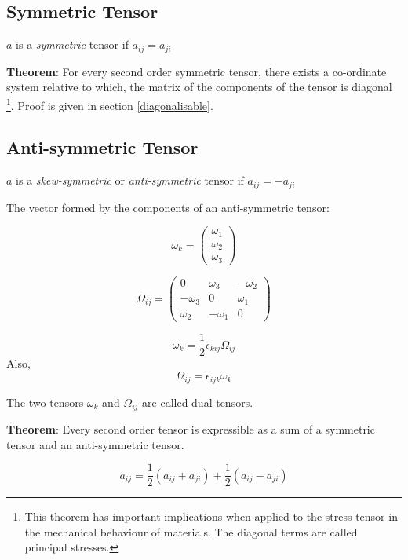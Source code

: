 \subsection{Symmetric Tensor}

$a$ is a {\em symmetric} tensor if $a_{ij} = a_{ji}$

{\bf Theorem}: For every second order symmetric tensor, there exists a co-ordinate system relative to which, the matrix of the components of the tensor is diagonal \footnote{This theorem has important implications when applied to the stress tensor in the mechanical behaviour of materials. The diagonal terms are called principal stresses.}. Proof is given in section \ref{diagonalisable}.

\subsection{Anti-symmetric Tensor}

$a$ is a {\em skew-symmetric} or {\em anti-symmetric} tensor if $a_{ij} = -a_{ji}$

The vector formed by the components of an anti-symmetric tensor:

$$
\omega_k = \left( 
\begin{array}{l}
\omega_1\\
\omega_2 \\ 
\omega_3
\end{array} 
\right)
$$

$$ \Omega_{ij} =  \left(
\begin{array}{ccc}
0 & \omega_3 & -\omega_2 \\
-\omega_3 & 0 & \omega_1 \\
\omega_2 & -\omega_1 & 0
\end{array} 
\right)
$$

$$\omega_k = \frac{1}{2} \epsilon_{kij} \Omega_{ij} $$
Also,
$$\Omega_{ij} = \epsilon_{ijk}\omega_{k}$$

The two tensors $\omega_k$ and $\Omega_{ij}$ are called dual tensors.

{\bf Theorem}: Every second order tensor is expressible as a sum of a symmetric tensor and an anti-symmetric tensor. 

\begin{equation}
a_{ij} = \frac{1}{2}\left( a_{ij}+a_{ji}\right) + \frac{1}{2}\left( a_{ij}-a_{ji}\right) 
\end{equation} 



